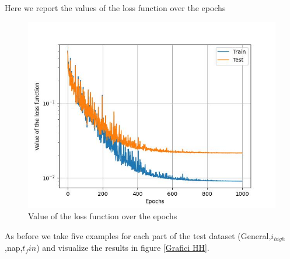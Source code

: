 \documentclass{article}
\begin{document}
Here we report the values of the loss function over the epochs
\begin{center}
    \begin{figure}[ht]
        \centering
        \includegraphics[width=0.5\linewidth]{images/loss_function_HH.jpg}
        \caption{Value of the loss function over the epochs}
        \label{fig:enter-label}
    \end{figure}
\end{center}


As before we take five examples for each part of the test dataset (General,$i_{high}$,nap,$t_fin$) and visualize the results in figure \ref{Grafici HH}.
\end{document}
